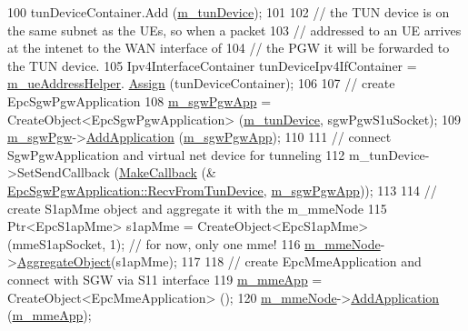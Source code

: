 \begin{DoxyCode}
100   tunDeviceContainer.Add (\hyperlink{classns3_1_1PointToPointEpcHelper_a57d0bd3ff019f5bec7254f0d03414128}{m\_tunDevice});
101   
102   \textcolor{comment}{// the TUN device is on the same subnet as the UEs, so when a packet}
103   \textcolor{comment}{// addressed to an UE arrives at the intenet to the WAN interface of}
104   \textcolor{comment}{// the PGW it will be forwarded to the TUN device. }
105   Ipv4InterfaceContainer tunDeviceIpv4IfContainer = \hyperlink{classns3_1_1PointToPointEpcHelper_a622990871d0bc28bceae79accc9cdf43}{m\_ueAddressHelper}.
      \hyperlink{classns3_1_1Ipv4AddressHelper_af8e7f4a1a7e74c00014a1eac445a27af}{Assign} (tunDeviceContainer);  
106 
107   \textcolor{comment}{// create EpcSgwPgwApplication}
108   \hyperlink{classns3_1_1PointToPointEpcHelper_ae802bf7daf9022ab6d78333de1ac5a31}{m\_sgwPgwApp} = CreateObject<EpcSgwPgwApplication> (\hyperlink{classns3_1_1PointToPointEpcHelper_a57d0bd3ff019f5bec7254f0d03414128}{m\_tunDevice}, sgwPgwS1uSocket);
109   \hyperlink{classns3_1_1PointToPointEpcHelper_a4adab05b0300264e93a3a81f249dfbd8}{m\_sgwPgw}->\hyperlink{classns3_1_1Node_ab98b4fdc4aadc86366b80e8a79a53f47}{AddApplication} (\hyperlink{classns3_1_1PointToPointEpcHelper_ae802bf7daf9022ab6d78333de1ac5a31}{m\_sgwPgwApp});
110   
111   \textcolor{comment}{// connect SgwPgwApplication and virtual net device for tunneling}
112   m\_tunDevice->SetSendCallback (\hyperlink{group__makecallbackmemptr_ga9376283685aa99d204048d6a4b7610a4}{MakeCallback} (&
      \hyperlink{classns3_1_1EpcSgwPgwApplication_aeea285ccd04a4350e4ddb77a359e97ca}{EpcSgwPgwApplication::RecvFromTunDevice}, 
      \hyperlink{classns3_1_1PointToPointEpcHelper_ae802bf7daf9022ab6d78333de1ac5a31}{m\_sgwPgwApp}));
113 
114   \textcolor{comment}{// create S1apMme object and aggregate it with the m\_mmeNode}
115   Ptr<EpcS1apMme> s1apMme = CreateObject<EpcS1apMme> (mmeS1apSocket, 1); \textcolor{comment}{// for now, only one mme!}
116   \hyperlink{classns3_1_1PointToPointEpcHelper_a426c5c35e890ce608c925348e4023b0f}{m\_mmeNode}->\hyperlink{classns3_1_1Object_a79dd435d300f3deca814553f561a2922}{AggregateObject}(s1apMme);
117 
118   \textcolor{comment}{// create EpcMmeApplication and connect with SGW via S11 interface}
119   \hyperlink{classns3_1_1PointToPointEpcHelper_a283ac6856b092d9cfa751c04029cbdc3}{m\_mmeApp} = CreateObject<EpcMmeApplication> ();
120   \hyperlink{classns3_1_1PointToPointEpcHelper_a426c5c35e890ce608c925348e4023b0f}{m\_mmeNode}->\hyperlink{classns3_1_1Node_ab98b4fdc4aadc86366b80e8a79a53f47}{AddApplication} (\hyperlink{classns3_1_1PointToPointEpcHelper_a283ac6856b092d9cfa751c04029cbdc3}{m\_mmeApp});

\end{DoxyCode}
